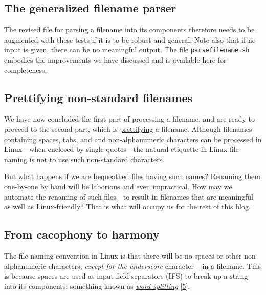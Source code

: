 \documentclass[
  a4paper,
]{article}
\begin{document}
\hypertarget{the-generalized-filename-parser}{%
\subsection{The generalized filename
parser}\label{the-generalized-filename-parser}}

The revised file for parsing a filename into its components therefore
needs to be augmented with these tests if it is to be robust and
general. Note also that if no input is given, there can be no meaningful
output. The file
\href{scripts/parsefilename.sh}{\texttt{parsefilename.sh}} embodies the
improvements we have discussed and is available here for completeness.

\hypertarget{prettifying-non-standard-filenames}{%
\subsection{Prettifying non-standard
filenames}\label{prettifying-non-standard-filenames}}

We have now concluded the first part of processing a filename, and are
ready to proceed to the second part, which is
\href{https://www.thefreedictionary.com/prettifying}{prettifying} a
filename. Although filenames containing spaces, tabs, and and
non-alphanumeric characters can be processed in Linux---when enclosed by
single quotes---the natural etiquette in Linux file naming is not to use
such non-standard characters.

But what happens if we are bequeathed files having such names? Renaming
them one-by-one by hand will be laborious and even impractical. How may
we automate the renaming of such files---to result in filenames that are
meaningful as well as Linux-friendly? That is what will occupy us for
the rest of this blog.

\hypertarget{from-cacophony-to-harmony}{%
\subsection{From cacophony to harmony}\label{from-cacophony-to-harmony}}

The file naming convention in Linux is that there will be no spaces or
other non-alphanumeric characters, \emph{except for the underscore}
character \texttt{\_} in a filename. This is because spaces are used as
input field separators (IFS) to break up a string into its components:
something known as
\href{https://mywiki.wooledge.org/WordSplitting?highlight=\%28spaces\%29\%7C\%28word\%29\%7C\%28splitting\%29}{\emph{word
splitting}} {[}\protect\hyperlink{ref-wordsplitting}{5}{]}.
\end{document}
